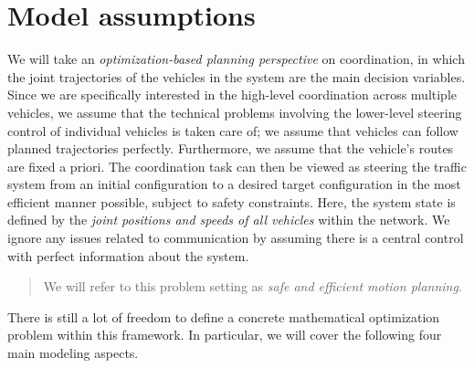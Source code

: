 \documentclass[a4paper]{report}
\theoremstyle{definition}
\theoremstyle{plain}
\begin{document}
\section{Model assumptions}

We will take an \emph{optimization-based planning perspective} on coordination,
in which the joint trajectories of the vehicles in the system are the main
decision variables.
%
Since we are specifically interested in the high-level coordination across
multiple vehicles, we assume that the technical problems involving the
lower-level steering control of individual vehicles is taken care of; we assume
that vehicles can follow planned trajectories perfectly.
%
Furthermore, we assume that the vehicle's routes are fixed a priori.
%
The coordination task can then be viewed as steering the traffic system from an
initial configuration to a desired target configuration in the most efficient
manner possible, subject to safety constraints.
%
Here, the system state is defined by the \emph{joint positions and speeds of all
  vehicles} within the network.
%
We ignore any issues related to communication by assuming there is a
central control with perfect information about the system.

\begin{quote}
  We will refer to this problem setting as \emph{safe and efficient motion planning}.
\end{quote}

\noindent
There is still a lot of freedom to define a concrete mathematical optimization
problem within this framework. In particular, we will cover the following four
main modeling aspects.
%
\end{document}
